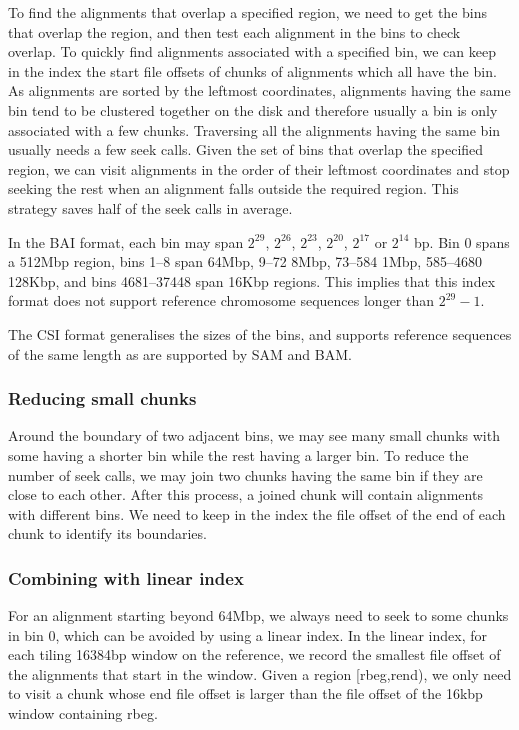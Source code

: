 \documentclass[10pt]{article}
\begin{document}

To find the alignments that overlap a specified region, we need to get
the bins that overlap the region, and then test each alignment in the
bins to check overlap. To quickly find alignments associated with a
specified bin, we can keep in the index the start file offsets of chunks
of alignments which all have the bin. As alignments are sorted by the
leftmost coordinates, alignments having the same bin tend to be
clustered together on the disk and therefore usually a bin is only
associated with a few chunks. Traversing all the alignments having the
same bin usually needs a few seek calls. Given the set of bins that
overlap the specified region, we can visit alignments in the order of
their leftmost coordinates and stop seeking the rest when an alignment
falls outside the required region. This strategy saves half of the seek
calls in average.

In the BAI format, each bin may span $2^{29}$, $2^{26}$, $2^{23}$, $2^{20}$,
$2^{17}$ or $2^{14}$ bp. Bin 0 spans a 512Mbp region, bins 1--8 span 64Mbp,
9--72 8Mbp, 73--584 1Mbp, 585--4680 128Kbp, and bins 4681--37448 span 16Kbp
regions.  This implies that this index format does not support reference
chromosome sequences longer than $2^{29}-1$.

The CSI format generalises the sizes of the bins, and supports reference
sequences of the same length as are supported by SAM and BAM.

\subsubsection{Reducing small chunks}
Around the boundary of two adjacent bins, we may see many small chunks
with some having a shorter bin while the rest having a larger bin. To
reduce the number of seek calls, we may join two chunks having the same
bin if they are close to each other. After this process, a joined chunk
will contain alignments with different bins. We need to keep in the
index the file offset of the end of each chunk to identify its
boundaries.

\subsubsection{Combining with linear index}
For an alignment starting beyond 64Mbp, we always need to seek to some
chunks in bin 0, which can be avoided by using a linear index. In the
linear index, for each tiling 16384bp window on the reference, we record
the smallest file offset of the alignments that start in the
window. Given a region [rbeg,rend), we only need to visit a chunk whose
end file offset is larger than the file offset of the 16kbp window
containing rbeg.
\end{document}
